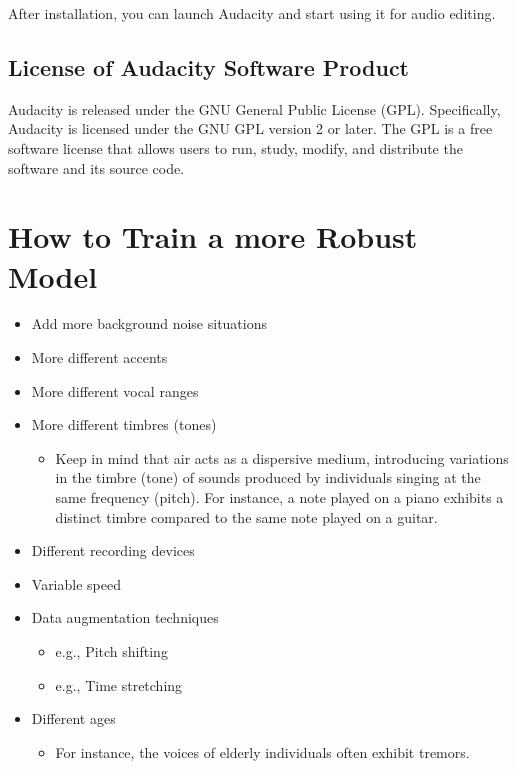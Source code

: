 After installation, you can launch Audacity and start using it for audio editing.

\subsection{License of Audacity Software Product}

Audacity is released under the GNU General Public License (GPL). Specifically, Audacity is licensed under the GNU GPL version 2 or later. The GPL is a free software license that allows users to run, study, modify, and distribute the software and its source code.


\section{How to Train a more Robust Model}

\begin{itemize}
	\item Add more background noise situations
	\item More different accents
	\item More different vocal ranges
	\item More different timbres (tones)
	\begin{itemize}
		\item Keep in mind that air acts as a dispersive medium, introducing variations in the timbre (tone) of sounds produced by individuals singing at the same frequency (pitch). For instance, a note played on a piano exhibits a distinct timbre compared to the same note played on a guitar.
	\end{itemize}
	\item Different recording devices
	\item Variable speed
	\item Data augmentation techniques
	\begin{itemize}
		\item e.g., Pitch shifting
		\item e.g., Time stretching
	\end{itemize}
	\item  Different ages
	\begin{itemize}
		\item For instance, the voices of elderly individuals often exhibit tremors.
	\end{itemize}
\end{itemize}

